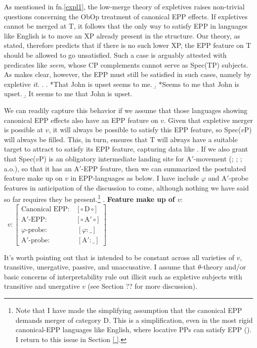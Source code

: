 \documentclass[11pt, letterpaper]{paper_nick}
\newcommand{\fm}[1]{[$\circ$#1$\circ$]}
\begin{document}
As mentioned in fn.\ref{expl1}, the low-merge theory of expletives raises non-trivial questions concerning the ObOp treatment of canonical EPP effects. If expletives cannot be merged at T, it follows that the only way to satisfy EPP in languages like English is to move an XP already present in the structure. Our theory, as stated, therefore predicts that if there is no such lower XP, the EPP feature on T should be allowed to go unsatisfied. Such a case is arguably attested with predicates like \emph{seem}, whose CP complements cannot serve as Spec(TP) subjects. As \Next makes clear, however, the EPP must still be satisfied in such cases, namely by expletive \emph{it}.
\ex. \a. *That John is upset seems to me.
\b. *Seems to me that John is upset.
\b. It seems to me that John is upset.
 
We can readily capture this behavior if we assume that those languages showing canonical EPP effects also have an EPP feature on $v$. Given that expletive merger is possible at $v$, it will always be possible to satisfy this EPP feature, so Spec($v$P) will always be filled. This, in turn, ensures that T will always have a suitable target to attract to satisfy its EPP feature, capturing data like \Last. If we also grant that Spec($v$P) is an obligatory intermediate landing site for A$'$-movement (\citealt{chomsky86}; \citealt{fox99}; \citealt{chomsky01}; a.o.), so that it has an A$'$-EPP feature, then we can summarized the postulated feature make up on $v$ in EPP-languages as below. I have include $\varphi$ and A$'$-probe features in anticipation of the discussion to come, although nothing we have said so far requires they be present.\footnote{Note that I have made the simplifying assumption that the canonical EPP demands merger of category D. This is a simplification, even in the most rigid canonical-EPP languages like English, where locative PPs can satisfy EPP (\citealt{bresnan89}). I return to this issue in Section \ref{ }.}
\ex. \textbf{Feature make up of $v$}:\\
\ $v: \left[\begin{array}{lc} \text{Canonical EPP: } & \text{\fm{D}}\\
\text{A$'$-EPP:} & \text{\fm{A$'$}}\\
\text{$\varphi$-probe:} & [\varphi:\_]\\
\text{A$'$-probe:} & [\text{A}':\_]
\end{array} \right]$

It's worth pointing out that \Last is intended to be constant across all varieties of $v$, transitive, unergative, passive, and unaccusative. I assume that $\theta$-theory and/or basic concerns of interpretability rule out illicit such as expletive subjects with transitive and unergative $v$ (see Section ?? for more discussion). 
\end{document}
